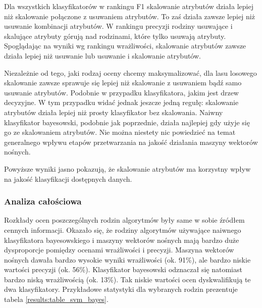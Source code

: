 \documentclass[../thesis.tex]{subfiles}
\begin{document}
Dla wszystkich klasyfikatorów w rankingu F1 skalowanie atrybutów działa lepiej niż skalowanie połączone z usuwaniem atrybutów. To zaś działa zawsze lepiej niż usuwanie kombinacji atrybutów. W rankingu precyzji rodziny usuwające i skalujące atrybuty górują nad rodzinami, które tylko usuwają atrybuty. Spoglądając na wyniki wg rankingu wrażliwości, skalowanie atrybutów zawsze działa lepiej niż usuwanie lub usuwanie i skalowanie atrybutów.

Niezależnie od tego, jaki rodzaj oceny chcemy maksymalizować, dla lasu losowego skalowanie zawsze sprawuje się lepiej niż skalowanie z usuwaniem bądź samo usuwanie atrybutów. Podobnie w przypadku klasyfikatora, jakim jest drzew decyzyjne. W tym przypadku widać jednak jeszcze jedną regułę: skalowanie atrybutów działa lepiej niż prosty klasyfikator bez skalowania. Naiwny klasyfikator bayesowski, podobnie jak poprzednie, działa najlepiej gdy użyje się go ze skalowaniem atrybutów. Nie można niestety nic powiedzieć na temat generalnego wpływu etapów przetwarzania na jakość działania maszyny wektorów nośnych.

Powyższe wyniki jasno pokazują, że skalowanie atrybutów ma korzystny wpływ na jakość klasyfikacji dostępnych danych.

\subsubsection{Analiza całościowa}

Rozkłady ocen poszczególnych rodzin algorytmów były same w sobie źródłem cennych informacji. Okazało się, że rodziny algorytmów używające naiwnego klasyfikatora bayesowskiego i maszyny wektorów nośnych mają bardzo duże dysproporcje pomiędzy ocenami wrażliwości i precyzji. Maszyna wektorów nośnych dawała bardzo wysokie wyniki wrażliwości (ok. 91\%), ale bardzo niskie wartości precyzji (ok. 56\%). Klasyfikator bayesowski odznaczał się natomiast bardzo niską wrażliwością (ok. 13\%). Tak niskie wartości ocen dyskwalifikują te dwa klasyfikatory. Przykładowe statystyki dla wybranych rodzin prezentuje tabela \ref{results:table_svm_bayes}.
\end{document}
